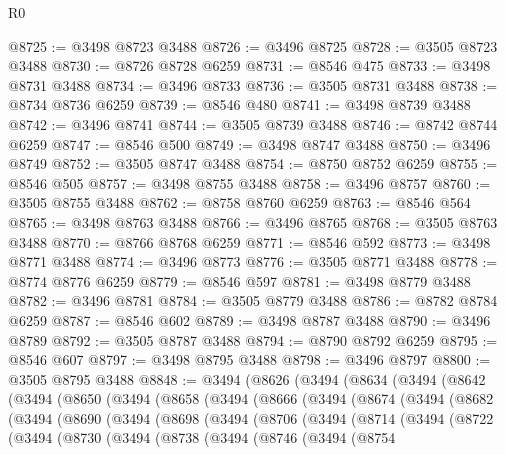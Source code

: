 \begin{lexlean}{R0}
\begin{coremodule}
@8725 := @3498 @8723 @3488
@8726 := @3496 @8725
@8728 := @3505 @8723 @3488
@8730 := @8726 @8728 @6259
@8731 := @8546 @475
@8733 := @3498 @8731 @3488
@8734 := @3496 @8733
@8736 := @3505 @8731 @3488
@8738 := @8734 @8736 @6259
@8739 := @8546 @480
@8741 := @3498 @8739 @3488
@8742 := @3496 @8741
@8744 := @3505 @8739 @3488
@8746 := @8742 @8744 @6259
@8747 := @8546 @500
@8749 := @3498 @8747 @3488
@8750 := @3496 @8749
@8752 := @3505 @8747 @3488
@8754 := @8750 @8752 @6259
@8755 := @8546 @505
@8757 := @3498 @8755 @3488
@8758 := @3496 @8757
@8760 := @3505 @8755 @3488
@8762 := @8758 @8760 @6259
@8763 := @8546 @564
@8765 := @3498 @8763 @3488
@8766 := @3496 @8765
@8768 := @3505 @8763 @3488
@8770 := @8766 @8768 @6259
@8771 := @8546 @592
@8773 := @3498 @8771 @3488
@8774 := @3496 @8773
@8776 := @3505 @8771 @3488
@8778 := @8774 @8776 @6259
@8779 := @8546 @597
@8781 := @3498 @8779 @3488
@8782 := @3496 @8781
@8784 := @3505 @8779 @3488
@8786 := @8782 @8784 @6259
@8787 := @8546 @602
@8789 := @3498 @8787 @3488
@8790 := @3496 @8789
@8792 := @3505 @8787 @3488
@8794 := @8790 @8792 @6259
@8795 := @8546 @607
@8797 := @3498 @8795 @3488
@8798 := @3496 @8797
@8800 := @3505 @8795 @3488
@8848 := @3494
    (@8626
      (@3494
        (@8634
          (@3494
            (@8642
              (@3494
                (@8650
                  (@3494
                    (@8658
                      (@3494
                        (@8666
                          (@3494
                            (@8674
                              (@3494
                                (@8682
                                  (@3494
                                    (@8690
                                      (@3494
                                        (@8698
                                          (@3494
                                            (@8706
                                              (@3494
                                                (@8714
                                                  (@3494
                                                    (@8722
                                                      (@3494
                                                        (@8730
                                                          (@3494
                                                            (@8738
                                                              (@3494
                                                                (@8746
                                                                  (@3494
                                                                    (@8754

\end{coremodule}
\end{lexlean}
